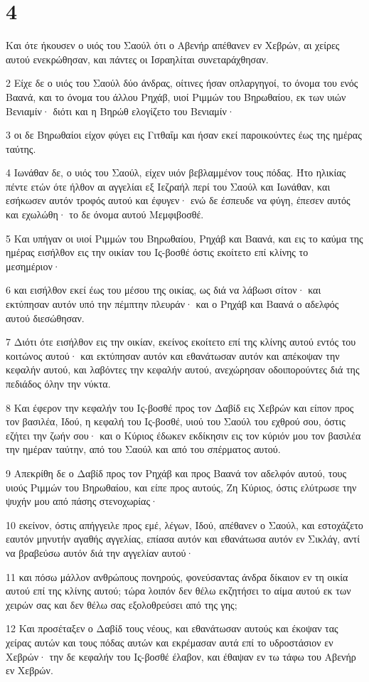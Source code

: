 \chapter{4}

\par Και ότε ήκουσεν ο υιός του Σαούλ ότι ο Αβενήρ απέθανεν εν Χεβρών, αι χείρες αυτού ενεκρώθησαν, και πάντες οι Ισραηλίται συνεταράχθησαν.
\par 2 Είχε δε ο υιός του Σαούλ δύο άνδρας, οίτινες ήσαν οπλαργηγοί, το όνομα του ενός Βαανά, και το όνομα του άλλου Ρηχάβ, υιοί Ριμμών του Βηρωθαίου, εκ των υιών Βενιαμίν· διότι και η Βηρώθ ελογίζετο του Βενιαμίν·
\par 3 οι δε Βηρωθαίοι είχον φύγει εις Γιτθαΐμ και ήσαν εκεί παροικούντες έως της ημέρας ταύτης.
\par 4 Ιωνάθαν δε, ο υιός του Σαούλ, είχεν υιόν βεβλαμμένον τους πόδας. Ήτο ηλικίας πέντε ετών ότε ήλθον αι αγγελίαι εξ Ιεζραήλ περί του Σαούλ και Ιωνάθαν, και εσήκωσεν αυτόν τροφός αυτού και έφυγεν· ενώ δε έσπευδε να φύγη, έπεσεν αυτός και εχωλώθη· το δε όνομα αυτού Μεμφιβοσθέ.
\par 5 Και υπήγαν οι υιοί Ριμμών του Βηρωθαίου, Ρηχάβ και Βαανά, και εις το καύμα της ημέρας εισήλθον εις την οικίαν του Ις-βοσθέ όστις εκοίτετο επί κλίνης το μεσημέριον·
\par 6 και εισήλθον εκεί έως του μέσου της οικίας, ως διά να λάβωσι σίτον· και εκτύπησαν αυτόν υπό την πέμπτην πλευράν· και ο Ρηχάβ και Βαανά ο αδελφός αυτού διεσώθησαν.
\par 7 Διότι ότε εισήλθον εις την οικίαν, εκείνος εκοίτετο επί της κλίνης αυτού εντός του κοιτώνος αυτού· και εκτύπησαν αυτόν και εθανάτωσαν αυτόν και απέκοψαν την κεφαλήν αυτού, και λαβόντες την κεφαλήν αυτού, ανεχώρησαν οδοιπορούντες διά της πεδιάδος όλην την νύκτα.
\par 8 Και έφερον την κεφαλήν του Ις-βοσθέ προς τον Δαβίδ εις Χεβρών και είπον προς τον βασιλέα, Ιδού, η κεφαλή του Ις-βοσθέ, υιού του Σαούλ του εχθρού σου, όστις εζήτει την ζωήν σου· και ο Κύριος έδωκεν εκδίκησιν εις τον κύριόν μου τον βασιλέα την ημέραν ταύτην, από του Σαούλ και από του σπέρματος αυτού.
\par 9 Απεκρίθη δε ο Δαβίδ προς τον Ρηχάβ και προς Βαανά τον αδελφόν αυτού, τους υιούς Ριμμών του Βηρωθαίου, και είπε προς αυτούς, Ζη Κύριος, όστις ελύτρωσε την ψυχήν μου από πάσης στενοχωρίας·
\par 10 εκείνον, όστις απήγγειλε προς εμέ, λέγων, Ιδού, απέθανεν ο Σαούλ, και εστοχάζετο εαυτόν μηνυτήν αγαθής αγγελίας, επίασα αυτόν και εθανάτωσα αυτόν εν Σικλάγ, αντί να βραβεύσω αυτόν διά την αγγελίαν αυτού·
\par 11 και πόσω μάλλον ανθρώπους πονηρούς, φονεύσαντας άνδρα δίκαιον εν τη οικία αυτού επί της κλίνης αυτού; τώρα λοιπόν δεν θέλω εκζητήσει το αίμα αυτού εκ των χειρών σας και δεν θέλω σας εξολοθρεύσει από της γης;
\par 12 Και προσέταξεν ο Δαβίδ τους νέους, και εθανάτωσαν αυτούς και έκοψαν τας χείρας αυτών και τους πόδας αυτών και εκρέμασαν αυτά επί το υδροστάσιον εν Χεβρών· την δε κεφαλήν του Ις-βοσθέ έλαβον, και έθαψαν εν τω τάφω του Αβενήρ εν Χεβρών.

